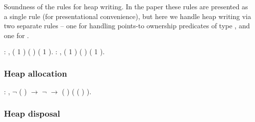 \documentclass[12pt]{report}
\begin{document}
 Soundness of the rules for heap writing. In the paper these rules are
    presented as a single rule (for presentational convenience), but here
    we handle heap writing via two separate rules -- one for handling
    points-to ownership predicates of type , and one for . \begin{coqdoccode}
\coqdocemptyline
\coqdocnoindent
{}  :\coqdoceol
\coqdocindent{1.00em}
\coqdockw{\ensuremath{\forall}}     ,\coqdoceol
\coqdocindent{1.00em}
   (  1  ) (  ) (  1  ).\coqdoceol
\coqdocnoindent
{}  :\coqdoceol
\coqdocindent{1.00em}
\coqdockw{\ensuremath{\forall}}     ,\coqdoceol
\coqdocindent{1.00em}
   (  1  ) (  ) (  1  ).\coqdoceol
\end{coqdoccode}
\subsubsection{Heap allocation}

\begin{coqdoccode}
\coqdocnoindent
{}  :\coqdoceol
\coqdocindent{1.00em}
\coqdockw{\ensuremath{\forall}}    ,\coqdoceol
\coqdocindent{1.00em}
\ensuremath{\lnot}   ( ) \ensuremath{\rightarrow}\coqdoceol
\coqdocindent{1.00em}
\ensuremath{\lnot}    \ensuremath{\rightarrow}\coqdoceol
\coqdocindent{1.00em}
    (  ) (   ( ) ).\coqdoceol
\end{coqdoccode}
\subsubsection{Heap disposal}
\end{document}
